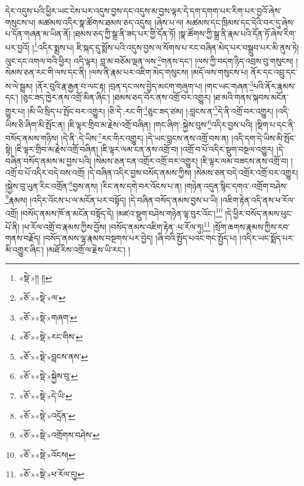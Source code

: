 དེར་འདུས་པའི་ཕྱིར་ཡང་ངེས་པར་འདུས་བྱས་དང་འདུས་མ་བྱས་ལྟར་དེ་དག་དགག་པར་རིག་པར་བྱའོ་ཞེས་གསུངས་པ། མཚམས་འདིར་སྣ་ཚོགས་ཐམས་ཅད་འདུས། །ཞེས་པ་ལ། མཚམས་དང་ཁྲིམས་དང་དེའི་བར་དུ་ཞེས་པ་དོན་གཞན་མ་ཡིན་ནོ། །ཐམས་ཅད་ཀྱི་སྒྲ་ནི་ཟད་པར་གྱི་དོན་ཏོ། །སྣ་ཚོགས་ཀྱི་སྒྲ་ནི་རྣམ་པའི་དོན་ཏོ་ཞེས་རིག་པར་བྱའོ། །\footnote{«སྡེ་»།། །།}འདིར་སྨྲས་པ། ཇི་སྐད་དུ་སྨོས་པའི་འདུས་བྱས་ལ་སོགས་པ་རང་བཞིན་མེད་པར་བསྒྲུབ་པར་མི་ནུས་ཏེ། ལུང་དང་འགལ་བའི་ཕྱིར། འདི་ལྟར། བླ་མ་བཅོམ་ལྡན་ལས་\footnote{«ཅོ་»«སྡེ་»ལ་}གནས་དང་། །ལས་ཀྱི་བདག་ཉིད་འབྲས་བུ་གསུངས། །སེམས་ཅན་རང་གི་ལས་དང་ནི། །ལས་ནི་རྣམ་པར་འཇིག་མེད་གསུངས། །མདོ་ལས་གསུངས་པ། ནོར་དང་འབྲུ་དང་ས་ལེ་སྦྲམ། །ནོར་བུའི་རྣ་རྒྱན་བ་ལང་རྟ། །བྲན་དང་ལས་བྱེད་མངག་གཞུག་པ། །གང་ཡང་གཞན་\footnote{«ཅོ་»«སྡེ་»གཞག་}པའི་ནོར་རྣམས་དང་། །ཅུང་ཟད་ཁྱེར་ནས་འགྲོ་མིན་ཞིང་། །ཐམས་ཅད་བོར་ནས་འགྲོ་བར་འགྱུར། །ཐ་མའི་གནས་སྐབས་མངོན་གྱུར་པ། །མི་ཡི་སྲིད་པ་སྤོང་བར་འགྱུར། །ཅི་དེ་:རང་གི་\footnote{«ཅོ་»«སྡེ་»རང་གིས་}ཅུང་ཟད་ཙམ། །:བླངས་ན་\footnote{«ཅོ་»«སྡེ་»བླངས་ནས་}དེ་ནི་འགྲོ་བར་འགྱུར། །འདི་ཡིས་ཅི་ཞིག་མི་སྤོང་ན། །ཇི་ལྟར་གྲིབ་མ་རྗེས་འགྲོ་བཞིན། །གང་ཞིག་:སྐྱེས་བུས་\footnote{«ཅོ་»«སྡེ་»སྐྱེས་བུ་}འདིར་བྱས་པའི། །སྡིག་པ་དང་ནི་བསོད་ནམས་གཉིས། །དེ་ནི་:དེ་ཡིས་\footnote{«ཅོ་»«སྡེ་»དེ་ཡི་}རང་གིར་འགྱུར། །དེ་ཡང་བླངས་ནས་འགྲོ་བས་ན། །འདི་དག་དེ་ཡིས་མི་སྤོང་སྟེ། །ཇི་ལྟར་གྲིབ་མ་རྗེས་འགྲོ་བཞིན། །ཇི་ལྟར་ལམ་ངན་ནས་འགྲོ་བ། །འགྲོ་བ་པོ་འདིར་སྡུག་བསྔལ་འགྱུར། །དེ་བཞིན་བསོད་ནམས་མ་བྱས་པའི། །སེམས་ཅན་ངན་འགྲོར་འགྲོ་བར་འགྱུར། །ཇི་ལྟར་ལམ་བཟངས་ནས་འགྲོ་བ། །འགྲོ་བ་པོ་འདིར་བདེ་བས་འགྲོ། །དེ་བཞིན་འདིར་བྱས་བསོད་ནམས་ཀྱིས། །སེམས་ཅན་བདེ་འགྲོར་འགྲོ་བར་འགྱུར། །སྐྱེས་བུ་ཡུན་རིང་འགྲོན་\footnote{«ཅོ་»«སྡེ་»འདྲོན་}བྱས་ནས། །རིང་ནས་དགེ་བར་འོངས་པ་ན། །གཉེན་འདུན་སྙིང་དགའ་:འགྲོག་བཤེས་\footnote{«ཅོ་»«སྡེ་»འགྲོགས་བཤེས་}རྣམས། །འདིར་འོངས་པ་ལ་མངོན་པར་བསྟོད། །དེ་བཞིན་བསོད་ནམས་བྱས་པ་ཡི། །འཇིག་རྟེན་འདི་ནས་ཕ་རོལ་འགྲོ། །བསོད་ནམས་ཁོ་ན་མངོན་བསྟོད་དེ། །མཛའ་སྡུག་བཤེས་གཉེན་ལྟ་བུར་འོང་།\footnote{«ཅོ་»«སྡེ་»འོངས།} །དེ་ཕྱིར་བསོད་ནམས་ཕུང་པོ་ནི། །ཕ་རོལ་འགྲོ་བ་རྣམས་ཀྱིས་བྱོས། །བསོད་ནམས་འཇིག་རྟེན་:ཕ་རོལ་ཏུ།\footnote{«ཅོ་»«སྡེ་»ཕ་རོལ་དུ།} །སྲོག་ཆགས་རྣམས་ཀྱིས་རབ་གནས་བརྗོད། །བསོད་ནམས་ལྷ་རྣམས་བསྔགས་པར་བྱེད། །ཞི་བའི་སྤྱོད་པའང་གང་སྤྱོད་པ། །འདིར་ཡང་སྨོད་པར་མི་འགྱུར་ཞིང་། །མཐོ་རིས་འགྲོ་ལ་རྗེས་ཡི་རང་། །
